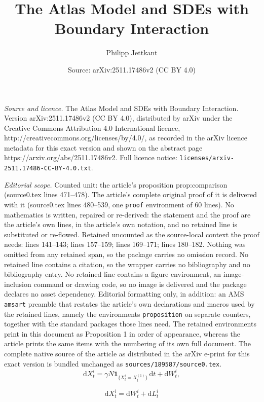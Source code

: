 \documentclass[10pt,a4paper]{amsart}
\title{The Atlas Model and SDEs with Boundary Interaction}
\author{Philipp Jettkant}
\date{Source: arXiv:2511.17486v2 (CC BY 4.0)}
\renewcommand{\bf}[1]{\mathbf{#1}}
\renewcommand{\d}{\mathrm{d}}
\begin{document}
\maketitle

\noindent\emph{Source and licence.} The Atlas Model and SDEs with Boundary Interaction. Version arXiv:2511.17486v2 (CC BY 4.0), distributed by arXiv under the Creative Commons Attribution 4.0 International licence, http://creativecommons.org/licenses/by/4.0/, as recorded in the arXiv licence metadata for this exact version and shown on the abstract page https://arxiv.org/abs/2511.17486v2. Full licence notice: \texttt{licenses/arxiv-2511.17486-CC-BY-4.0.txt}.\par\smallskip

\noindent\textit{Editorial scope.} Counted unit: the article's proposition prop:comparison (source0.tex lines 471--478). The article's complete original proof of it is delivered with it (source0.tex lines 480--539, one \texttt{proof} environment of 60 lines). No mathematics is written, repaired or re-derived: the statement and the proof are the article's own lines, in the article's own notation, and no retained line is substituted or re-flowed.  Retained uncounted as the source-local context the proof needs: lines 141--143; lines 157--159; lines 169--171; lines 180--182.  Nothing was omitted from any retained span, so the package carries no omission record.  No retained line contains a citation, so the wrapper carries no bibliography and no bibliography entry.  No retained line contains a figure environment, an image-inclusion command or drawing code, so no image is delivered and the package declares no asset dependency.  Editorial formatting only, in addition: an AMS \texttt{amsart} preamble that restates the article's own declarations and macros used by the retained lines, namely the environments \texttt{proposition} on separate counters, together with the standard packages those lines need.  The retained environments print in this document as Proposition 1 in order of appearance, whereas the article prints the same items with the numbering of its own full document.  The complete native source of the article as distributed in the arXiv e-print for this exact version is bundled unchanged as \texttt{sources/189587/source0.tex}.
\begin{equation} \label{eq:ps}
    \d X^i_t = \gamma N \bf{1}_{\{X^i_t = X^{(1)}_t\}} \, \d t + \d W^i_t,
\end{equation}

\begin{equation} \label{eq:ps_reflected}
    \d X^i_t = \d W^i_t + \d L^i_t
\end{equation}
\end{document}
